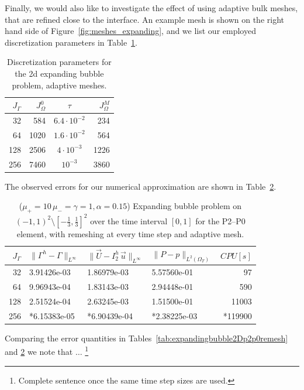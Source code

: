 \documentclass[a4paper,12pt,onecolumn]{article}
\newcommand{\errorXx}{\|\Gamma^h - \Gamma\|_{L^\infty}}
\newcommand{\errorUu}[1]{\|\vec U - I^h_{#1}\,\vec u\|_{L^\infty}}
\newcommand{\LerrorPp}{\|P - p\|_{L^2(\Omega_T)}}
\begin{document}
Finally, we would also like to investigate the effect of using adaptive bulk
meshes, that are refined close to the interface. An example mesh is shown on
the right hand side of Figure~\ref{fig:meshes_expanding}, and we list our
employed discretization parameters in 
Table~\ref{tab:expandingbubble2Delements_adaptive}.
\begin{table}
\center
\begin{tabular}{rrcr}
\hline
$J_\Gamma$ & $J_\Omega^0$ & $\tau$ & $J_\Omega^M$ \\
\hline
 32 &  584 & $6.4\cdot10^{-2}$ &  234 \\
 64 & 1020 & $1.6\cdot10^{-2}$ &  564 \\
128 & 2506 &   $4\cdot10^{-3}$ & 1226 \\
256 & 7460 &         $10^{-3}$ & 3860 \\
\hline
\end{tabular}
\caption{Discretization parameters for the 2d expanding bubble problem, 
adaptive meshes.}
\label{tab:expandingbubble2Delements_adaptive}
\end{table}
The observed errors for our numerical approximation are shown in
Table~\ref{tab:expandingbubble2Dp2p0adaptive}.
\begin{table}
 \center
\begin{tabular}{rlllr}
\hline
$J_\Gamma$ & $\errorXx$ & $\errorUu2$ & $\LerrorPp$ & $CPU[s]$\\
\hline
 32 & 3.91426e-03 & 1.86979e-03 & 5.57560e-01 &   97 \\
 64 & 9.96943e-04 & 1.83143e-03 & 2.94448e-01 &   590 \\
128 & 2.51524e-04 & 2.63245e-03 & 1.51500e-01 & 11003 \\
256 & *6.15383e-05 & *6.90439e-04 & *2.38225e-03 & *119900\\
\hline
\end{tabular}
\caption{($\mu_+ = 10\,\mu_- = \gamma = 1,\alpha = 0.15$) Expanding bubble 
problem on $(-1,1)^2\setminus[-\frac{1}{3},\frac{1}{3}]^2$ over the time 
interval $[0,1]$ for the P2--P0 element, with remeshing at every time step and 
adaptive mesh.}
\label{tab:expandingbubble2Dp2p0adaptive}
\end{table}
Comparing the error quantities in Tables~\ref{tab:expandingbubble2Dp2p0remesh}
and \ref{tab:expandingbubble2Dp2p0adaptive} we note that $\ldots$
\footnote{Complete sentence once the same time step sizes are used.}
\end{document}
